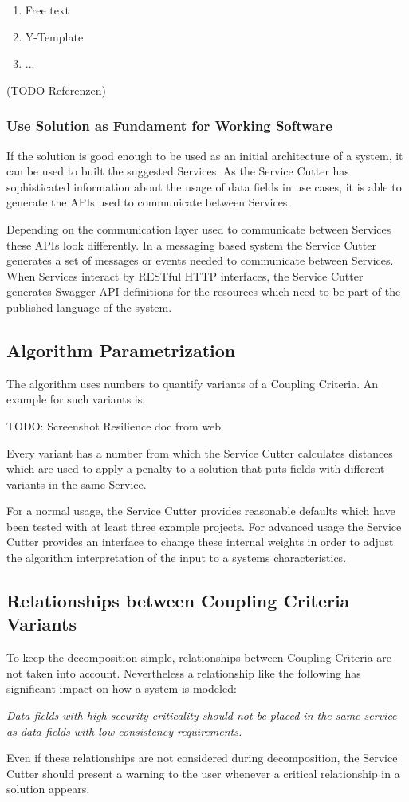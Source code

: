 \begin{enumerate}
	\item Free text
	\item Y-Template
	\item ...
\end{enumerate}
(TODO Referenzen)

\subsubsection{Use Solution as Fundament for Working Software}

If the solution is good enough to be used as an initial architecture of a system, it can be used to built the suggested Services. As the Service Cutter has sophisticated information about the usage of data fields in use cases, it is able to generate the APIs used to communicate between Services. 

Depending on the communication layer used to communicate between Services these APIs look differently. In a messaging based system the Service Cutter generates a set of messages or events needed to communicate between Services. When Services interact by RESTful HTTP interfaces, the Service Cutter generates Swagger\cite{swagger} API definitions for the resources which need to be part of the published language\cite[p.375]{evans2003domain} of the system. 


\subsection{Algorithm Parametrization}

The algorithm uses numbers to quantify variants of a Coupling Criteria. An example for such variants is:

TODO: Screenshot Resilience doc from web

Every variant has a number from which the Service Cutter calculates distances which are used to apply a penalty to a solution that puts fields with different variants in the same Service. 

For a normal usage, the Service Cutter provides reasonable defaults which have been tested with at least three example projects. For advanced usage the Service Cutter provides an interface to change these internal weights in order to adjust the algorithm interpretation of the input to a systems characteristics. 

\subsection{Relationships between Coupling Criteria Variants}

To keep the decomposition simple, relationships between Coupling Criteria are not taken into account. Nevertheless a relationship like the following has significant impact on how a system is modeled:

\textit{Data fields with high security criticality should not be placed in the same service as data fields with low consistency requirements.}

Even if these relationships are not considered during decomposition, the Service Cutter should present a warning to the user whenever a critical relationship in a solution appears.
